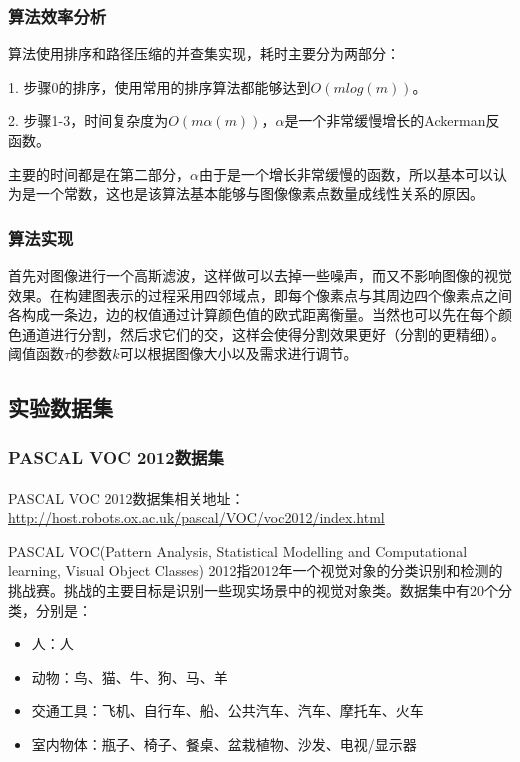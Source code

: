 \documentclass[a4paper, 12pt, UTF8]{article}
\begin{document}
\subsubsection{算法效率分析}

算法使用排序和路径压缩的并查集实现，耗时主要分为两部分：

1. 步骤0的排序，使用常用的排序算法都能够达到$O(mlog(m))$。

2. 步骤1-3，时间复杂度为$O(m\alpha(m))$，$\alpha$是一个非常缓慢增长的Ackerman反函数。

主要的时间都是在第二部分，$\alpha$由于是一个增长非常缓慢的函数，所以基本可以认为是一个常数，这也是该算法基本能够与图像像素点数量成线性关系的原因。

\subsubsection{算法实现}

首先对图像进行一个高斯滤波，这样做可以去掉一些噪声，而又不影响图像的视觉效果。在构建图表示的过程采用四邻域点，即每个像素点与其周边四个像素点之间各构成一条边，边的权值通过计算颜色值的欧式距离衡量。当然也可以先在每个颜色通道进行分割，然后求它们的交，这样会使得分割效果更好（分割的更精细）。阈值函数$\tau$的参数$k$可以根据图像大小以及需求进行调节。


\subsection{实验数据集}

\subsubsection{PASCAL VOC 2012数据集}

PASCAL VOC 2012\textsuperscript{\cite{ref3}}数据集相关地址：\url{http://host.robots.ox.ac.uk/pascal/VOC/voc2012/index.html}

PASCAL VOC(Pattern Analysis, Statistical Modelling and Computational learning, Visual Object Classes) 2012指2012年一个视觉对象的分类识别和检测的挑战赛。挑战的主要目标是识别一些现实场景中的视觉对象类。数据集中有20个分类，分别是：

\begin{itemize}

\item 人：人

\item 动物：鸟、猫、牛、狗、马、羊

\item 交通工具：飞机、自行车、船、公共汽车、汽车、摩托车、火车

\item 室内物体：瓶子、椅子、餐桌、盆栽植物、沙发、电视/显示器

\end{itemize}
\end{document}
